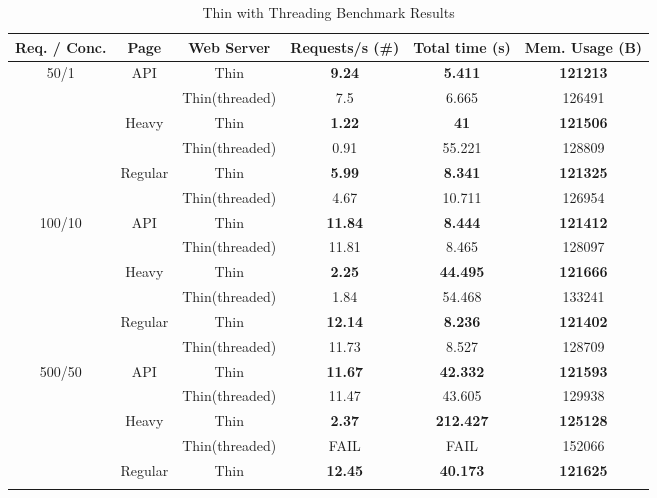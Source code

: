 \begin{table}[h!t]
  \centering
  \caption{Thin with Threading Benchmark Results}
  \label{tab:thin_threaded_benchmark}
  
  \begin{tabular}{c|c|c|c|c|c}

    \textbf{Req. / Conc.} & \textbf{Page} & \textbf{Web Server} & \textbf{Requests/s (\#)} & \textbf{Total time (s)} & \textbf{Mem. Usage (B)} \\ \hline
    \multirow{6}{*}{50/1} & \multirow{2}{*}{API} & Thin & \textbf{9.24} & \textbf{5.411} & \textbf{121213}\\\cline{3-6}
     &  & Thin(threaded) & 7.5 & 6.665 & 126491\\\cline{2-6}
     & \multirow{2}{*}{Heavy} & Thin & \textbf{1.22} & \textbf{41} & \textbf{121506}\\\cline{3-6}
     &  & Thin(threaded) & 0.91 & 55.221 & 128809\\\cline{2-6}
     & \multirow{2}{*}{Regular} & Thin & \textbf{5.99} & \textbf{8.341} & \textbf{121325}\\\cline{3-6}
     &  & Thin(threaded) & 4.67 & 10.711 & 126954\\\hline
    \multirow{6}{*}{100/10} & \multirow{2}{*}{API} & Thin & \textbf{11.84} & \textbf{8.444} & \textbf{121412}\\\cline{3-6}
     &  & Thin(threaded) & 11.81 & 8.465 & 128097\\\cline{2-6}
     & \multirow{2}{*}{Heavy} & Thin & \textbf{2.25} & \textbf{44.495} & \textbf{121666}\\\cline{3-6}
     &  & Thin(threaded) & 1.84 & 54.468 & 133241\\\cline{2-6}
     & \multirow{2}{*}{Regular} & Thin & \textbf{12.14} & \textbf{8.236} & \textbf{121402}\\\cline{3-6}
     &  & Thin(threaded) & 11.73 & 8.527 & 128709\\\hline
    \multirow{6}{*}{500/50} & \multirow{2}{*}{API} & Thin & \textbf{11.67} & \textbf{42.332} & \textbf{121593}\\\cline{3-6}
     &  & Thin(threaded) & 11.47 & 43.605 & 129938\\\cline{2-6}
     & \multirow{2}{*}{Heavy} & Thin & \textbf{2.37} & \textbf{212.427} & \textbf{125128}\\\cline{3-6}
     &  & Thin(threaded) & FAIL & FAIL & 152066\\\cline{2-6}
     & \multirow{2}{*}{Regular} & Thin & \textbf{12.45} & \textbf{40.173} & \textbf{121625}\\\cline{3-6}

\end{tabular}
\end{table}
